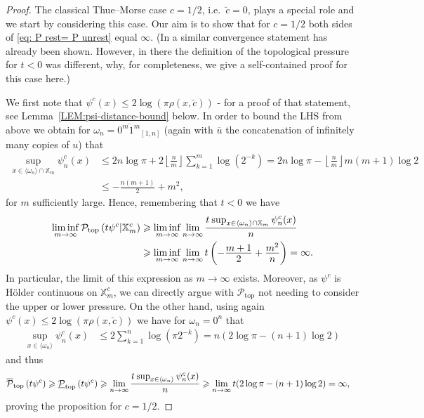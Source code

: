 \documentclass[11pt,reqno]{amsart}
\theoremstyle{plain}
\theoremstyle{definition}
\newcommand{\X}{{\mathbb X}}
\newcommand{\ts}{\hspace{0.5pt}}
\newcommand{\myfrac}[2]{\frac{\raisebox{-2pt}{$#1$}}
      {\raisebox{0.5pt}{$#2$}}}
\begin{document}
\begin{proof}
The classical Thue{\ts}--Morse case $c=1/2$, i.e.\ $\breve{c}=0$, plays a special role and we start by considering this case.
 Our aim is to show that for $c=1/2$ both sides of \eqref{eq: P rest= P unrest} equal $\infty$. (In \cite{BGKS} a similar  convergence statement has already been shown. However, in there the definition of the topological pressure for $t<0$ was different, why, for completeness, we give a self-contained proof for this case here.)
 
 We first note that $\psi^c(x)
\leqslant 2 \log (\pi \rho(x, \breve{c}))$ - for a proof of that statement, see Lemma~\ref{LEM:psi-distance-bound} below.
 In order to bound the LHS from above we obtain for $\omega_n=\overline{0^m1^m}_{[1,n]}$ (again with $\overline{u}$ the concatenation of infinitely many copies of $u$) that
\begin{align*}
 \sup_{x\in\langle\omega_n\rangle\cap\X_m}\psi^{c}_{n}(x)
 &\leqslant 2n\log \pi+ 2\left\lfloor \frac{n}{m} \right\rfloor  \sum_{k=1}^m \log (2^{-k})
 =2n\log \pi -\left\lfloor \frac{n}{m} \right\rfloor m(m+1)\log 2\\
 &\leqslant -\frac{ n(m+1)}{2}+m^2, 
\end{align*}
for $m$ sufficiently large. 
Hence, remembering that $t<0$ we have
\begin{align*}
 \liminf_{m\to\infty} \mathcal{P}_{\operatorname{top}}\left(t\psi^{c}\lvert\X_m^{c}\right)
 &\geqslant  \liminf_{m\to\infty} \lim_{n\to\infty}\myfrac{t\ts \sup_{x\in\langle\omega_n\rangle\cap\X_m}\psi^{c}_{n}(x)}{n}
\\ &\geqslant  \liminf_{m\to\infty}\lim_{n\to\infty}t\left( - \myfrac{m+1}{2}+\myfrac{m^2}{n}\right)=\infty. 
\end{align*}
In particular, the limit of this expression as $m \to \infty$ exists. Moreover, as $\psi^c$ is H\"older continuous on $\X_m^c$, we can directly argue with $\mathcal{P}_{\operatorname{top}}$ not needing to consider the upper or lower pressure.
On the other hand, using again $\psi^c(x)
\leqslant 2 \log (\pi \rho(x, \breve{c}))$ we have for $\omega_n=0^n$ that 
\begin{align*}
  \sup_{x\in\langle\omega_n\rangle}\psi^{c}_{n}(x)
 &\leqslant 2\sum_{k=1}^n\log(\pi 2^{-k})
 = n(2  \log \pi -  (n+1)\log 2)
\end{align*}
and thus
\begin{align*}
\overline{\mathcal{P}}_{\operatorname{top}}\left(t\psi^{c}\right)
 \geqslant \underline{\mathcal{P}}_{\operatorname{top}}\left(t\psi^{c}\right)
 &\geqslant \lim_{n\to\infty}\myfrac{t\ts \sup_{x\in\langle\omega_n\rangle}\psi^{c}_{n}(x)}{n}
 \geqslant \lim_{n\to\infty}t(2  \log \pi - (n+1)\log 2)=\infty,
\end{align*}
proving the proposition for $c=1/2$. 



\end{proof}
\end{document}
